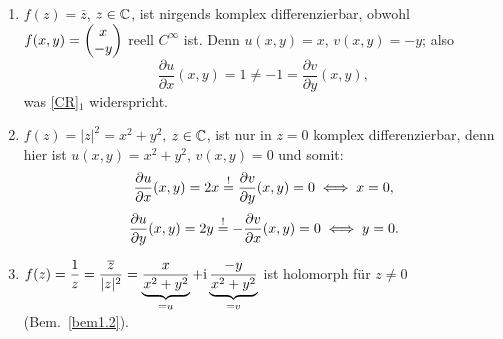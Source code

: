 \documentclass[a4paper,twoside,DIV15,BCOR12mm]{scrbook}
\begin{document}
\begin{bsp} \label{bsp1.5}
\begin{enumerate}
\item $f(z) = \bar{z}$, $z\in\mathbb{C}$, ist nirgends komplex differenzierbar, obwohl $f(x,y) = \left(\!\!\!\begin{array}{c}x\\-y\end{array}\!\!\!\right)$ reell $C^\infty$ ist. Denn $u(x,y) = x$, $v(x,y) = -y$; also 
\[\frac{\partial u}{\partial x}(x,y) = 1 \neq -1 = \frac{\partial v}{\partial y}(x,y),\]
was \eqref{CR}$_1$ widerspricht.
\item $f(z) = |z|^2 = x^2 + y^2$, $z\in\mathbb{C}$, ist nur in $z=0$ komplex differenzierbar, denn hier ist $u(x,y) = x^2+y^2$, $v(x,y) = 0$ und somit:
\[\frac{\partial u}{\partial x}(x,y) = 2x \stackrel{!}{=} \frac{\partial v}{\partial y}(x,y) = 0 \iff x=0,\]
\[\frac{\partial u}{\partial y}(x,y) = 2y \stackrel{!}{=} -\frac{\partial v}{\partial x}(x,y) = 0 \iff y=0.\]
\item $\displaystyle f(z) = \frac{1}{z} = \frac{\overline{z}}{|z|^2} = \underbrace{\frac{x}{x^2+y^2}}_{=u} + \mathrm{i}\underbrace{\frac{-y}{x^2+y^2}}_{=v}$ ist holomorph für $z\neq 0$ (Bem.~\ref{bem1.2}).
\end{enumerate}
\end{bsp}
\end{document}
